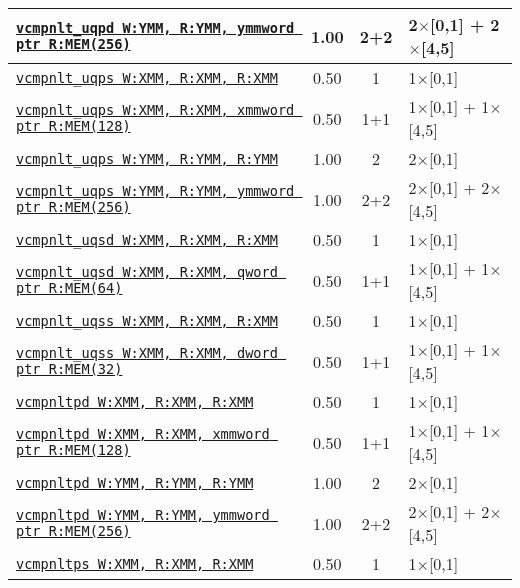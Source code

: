 \documentclass[a4paper,english,fontsize=9]{scrartcl}
\begin{document}
\begin{longtable}{p{}ccL{.25\textwidth}}
  \midrule
  \texttt{\href{https://felixcloutier.com/x86/CMPPD.html}{vcmpnlt\_uqpd W:YMM, R:YMM, ymmword ptr R:MEM(256)}} & 1.00 & 2+2 & 2\(\times\)[0,1] + 2\(\times\)[4,5] \\
  \midrule
  \texttt{\href{https://felixcloutier.com/x86/CMPPS.html}{vcmpnlt\_uqps W:XMM, R:XMM, R:XMM}} & 0.50 & 1 & 1\(\times\)[0,1] \\
  \midrule
  \texttt{\href{https://felixcloutier.com/x86/CMPPS.html}{vcmpnlt\_uqps W:XMM, R:XMM, xmmword ptr R:MEM(128)}} & 0.50 & 1+1 & 1\(\times\)[0,1] + 1\(\times\)[4,5] \\
  \midrule
  \texttt{\href{https://felixcloutier.com/x86/CMPPS.html}{vcmpnlt\_uqps W:YMM, R:YMM, R:YMM}} & 1.00 & 2 & 2\(\times\)[0,1] \\
  \midrule
  \texttt{\href{https://felixcloutier.com/x86/CMPPS.html}{vcmpnlt\_uqps W:YMM, R:YMM, ymmword ptr R:MEM(256)}} & 1.00 & 2+2 & 2\(\times\)[0,1] + 2\(\times\)[4,5] \\
  \midrule
  \texttt{\href{https://felixcloutier.com/x86/CMPSD.html}{vcmpnlt\_uqsd W:XMM, R:XMM, R:XMM}} & 0.50 & 1 & 1\(\times\)[0,1] \\
  \midrule
  \texttt{\href{https://felixcloutier.com/x86/CMPSD.html}{vcmpnlt\_uqsd W:XMM, R:XMM, qword ptr R:MEM(64)}} & 0.50 & 1+1 & 1\(\times\)[0,1] + 1\(\times\)[4,5] \\
  \midrule
  \texttt{\href{https://felixcloutier.com/x86/CMPSS.html}{vcmpnlt\_uqss W:XMM, R:XMM, R:XMM}} & 0.50 & 1 & 1\(\times\)[0,1] \\
  \midrule
  \texttt{\href{https://felixcloutier.com/x86/CMPSS.html}{vcmpnlt\_uqss W:XMM, R:XMM, dword ptr R:MEM(32)}} & 0.50 & 1+1 & 1\(\times\)[0,1] + 1\(\times\)[4,5] \\
  \midrule
  \texttt{\href{https://felixcloutier.com/x86/CMPPD.html}{vcmpnltpd W:XMM, R:XMM, R:XMM}} & 0.50 & 1 & 1\(\times\)[0,1] \\
  \midrule
  \texttt{\href{https://felixcloutier.com/x86/CMPPD.html}{vcmpnltpd W:XMM, R:XMM, xmmword ptr R:MEM(128)}} & 0.50 & 1+1 & 1\(\times\)[0,1] + 1\(\times\)[4,5] \\
  \midrule
  \texttt{\href{https://felixcloutier.com/x86/CMPPD.html}{vcmpnltpd W:YMM, R:YMM, R:YMM}} & 1.00 & 2 & 2\(\times\)[0,1] \\
  \midrule
  \texttt{\href{https://felixcloutier.com/x86/CMPPD.html}{vcmpnltpd W:YMM, R:YMM, ymmword ptr R:MEM(256)}} & 1.00 & 2+2 & 2\(\times\)[0,1] + 2\(\times\)[4,5] \\
  \midrule
  \texttt{\href{https://felixcloutier.com/x86/CMPPS.html}{vcmpnltps W:XMM, R:XMM, R:XMM}} & 0.50 & 1 & 1\(\times\)[0,1] \\

\end{longtable}
\end{document}
